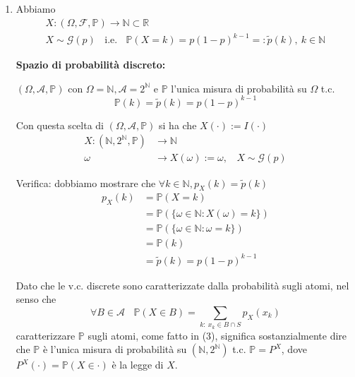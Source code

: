 \begin{enumerate}
\item Abbiamo\begin{gather*}
X:( \Omega ,\mathcal{F} ,\mathbb{P})\rightarrow \mathbb{N} \subset \mathbb{R}\\
X\sim \mathcal{G}( p) \ \ \ \ \text{i.e.} \ \ \ \ \mathbb{P}( X=k) =p( 1-p)^{k-1} =:\tilde{p}( k) ,\ k\in \mathbb{N}
\end{gather*}

\textbf{Spazio di probabilità discreto:}

$( \Omega ,\mathcal{A} ,\mathbb{P})$ con $\Omega =\mathbb{N} ,\mathcal{A} =2^{\mathbb{N}}$ e $\mathbb{P}$ l'unica misura di probabilità su $\Omega $ t.c.\begin{equation}
\mathbb{P}( k) =\tilde{p}( k) =p( 1-p)^{k-1}
\end{equation}

Con questa scelta di $( \Omega ,\mathcal{A} ,\mathbb{P})$ si ha che $X( \cdotp ) :=I( \cdotp )$\begin{align*}
X:\left(\mathbb{N} ,2^{\mathbb{N}} ,\mathbb{P}\right) & \rightarrow \mathbb{N}\\
\omega  & \rightarrow X( \omega ) :=\omega ,\ \ \ \ X\sim \mathcal{G}( p)
\end{align*}

Verifica: dobbiamo mostrare che $\forall k\in \mathbb{N} ,p_{X}( k) =\tilde{p}( k)$\begin{align*}
p_{X}( k) & =\mathbb{P}( X=k)\\
 & =\mathbb{P}(\{\omega \in \mathbb{N} :X( \omega ) =k\})\\
 & =\mathbb{P}(\{\omega \in \mathbb{N} :\omega =k\})\\
 & =\mathbb{P}( k)\\
 & =\tilde{p}( k) =p( 1-p)^{k-1}
\end{align*}

\begin{oss}
Dato che le v.c. discrete sono caratterizzate dalla probabilità sugli atomi, nel senso che
\begin{equation*}
\forall B\in \mathcal{A} \ \ \ \ \mathbb{P}( X\in B) =\sum\limits _{k:\ x_{k} \in B\cap S} p_{X}( x_{k})
\end{equation*}
caratterizzare $\mathbb{P}$ sugli atomi, come fatto in (3), significa sostanzialmente dire che $\mathbb{P}$ è l'unica misura di probabilità su $\left(\mathbb{N} ,2^{\mathbb{N}}\right)$ t.c. $\mathbb{P} =P^{X}$, dove $P^{X}( \cdotp ) =\mathbb{P}( X\in \cdotp )$ è la legge di $X$.


\end{oss}
\end{enumerate}
